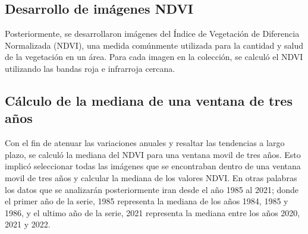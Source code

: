 {\small
\subsection{\textbf{Desarrollo de imágenes NDVI}}
Posteriormente, se desarrollaron imágenes del Índice de Vegetación de Diferencia Normalizada (NDVI), una medida comúnmente utilizada para la cantidad y salud de la vegetación en un área. Para cada imagen en la colección, se calculó el NDVI utilizando las bandas roja e infrarroja cercana.\\
}

{\small
\subsection{\textbf{Cálculo de la mediana de una ventana de tres años}}
Con el fin de atenuar las variaciones anuales y resaltar las tendencias a largo plazo, se calculó la mediana del NDVI para una ventana movil de tres años. Esto implicó seleccionar todas las imágenes que se encontraban dentro de una ventana movil de tres años y calcular la mediana de los valores NDVI. En otras palabras los datos que se analizarán posteriormente iran desde el año 1985 al 2021; donde el primer año de la serie, 1985 representa la mediana de los años 1984, 1985 y 1986, y el ultimo año de la serie, 2021 representa la mediana entre los años 2020, 2021 y 2022. \\
}




